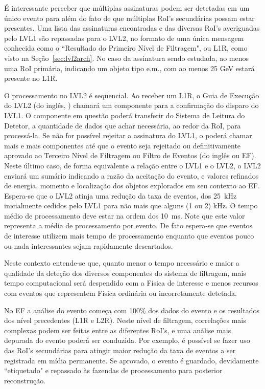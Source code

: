 É interessante perceber que múltiplas assinaturas podem ser detetadas em um
único evento para além do fato de que múltiplas RoI's secundárias possam estar
presentes. Uma lista das assinaturas encontradas e das diversas RoI's
averiguadas pelo LVL1 são repassadas para o LVL2, no formato de uma única
mensagem conhecida como o ``Resultado do Primeiro Nível de Filtragem", ou L1R,
como visto na Seção~\ref{sec:lvl2arch}. No caso da assinatura sendo estudada,
ao menos uma RoI primária, indicando um objeto tipo e.m., com ao menos 25 GeV
estará presente no L1R.

O processamento no LVL2 é seqüencial. Ao receber um L1R, o Guia de Execução do
LVL2 (do inglês, ) chamará um componente para a confirmação do
disparo do LVL1. O componente em questão poderá transferir do Sistema de
Leitura do Detetor, a quantidade de dados que achar necessária, ao redor da
RoI, para processá-la. Se não for possível rejeitar a assinatura do LVL1, o
 poderá chamar mais e mais componentes até que o evento seja
rejeitado ou definitivamente aprovado ao Terceiro Nível de Filtragem ou Filtro
de Eventos (do inglês  ou EF). Neste último caso, de forma
equivalente a relação entre o LVL1 e o LVL2, o LVL2 enviará um sumário
indicando a razão da aceitação do evento, e valores refinados de energia,
momento e localização dos objetos explorados em seu contexto ao EF. Espera-se
que o LVL2 atinja uma redução da taxa de eventos, dos 25~kHz inicialmente
cedidos pelo LVL1 para não mais que alguns (1 ou 2) kHz. O tempo médio de
processamento deve estar na ordem dos 10~ms. Note que este valor representa a
média de processamento por evento. De fato espera-se que eventos de interesse
utilizem mais tempo de processamento enquanto que eventos pouco ou nada
interessantes sejam rapidamente descartados.

Neste contexto entende-se que, quanto menor o tempo necessário e maior a
qualidade da deteção dos diversos componentes do sistema de filtragem, mais
tempo computacional será despendido com a Física de interesse e menos recursos
com eventos que representem Física ordinária ou incorretamente detetada.

No EF a análise do evento começa com 100\% dos dados do evento e os resultados
dos nível precedentes (L1R e L2R). Neste nível de filtragem, correlações mais
complexas podem ser feitas entre as diferentes RoI's, e uma análise mais
depurada do evento poderá ser conduzida. Por exemplo, é possível se fazer uso
das RoI's secundárias para atingir maior redução da taxa de eventos a ser
registrada em mídia permanente. Se aprovado, o evento é guardado, devidamente
``etiquetado" e repassado às fazendas de processamento  para
posterior reconstrução.

